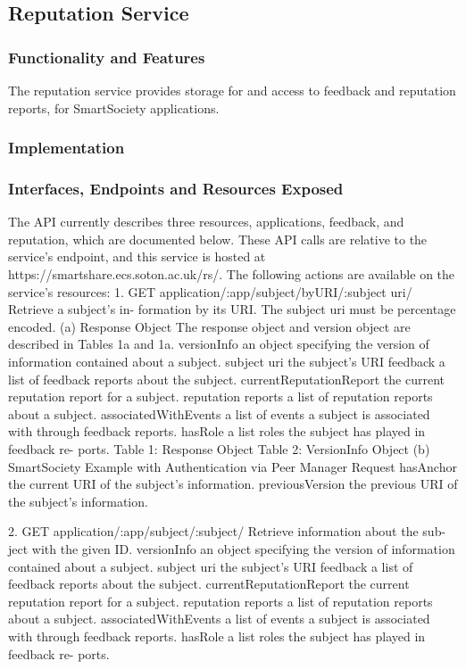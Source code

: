 \subsection{Reputation Service}
\subsubsection{Functionality and Features}
The reputation service provides storage for and access to feedback and reputation reports, for SmartSociety applications.
\subsubsection{Implementation}
\subsubsection{Interfaces, Endpoints and Resources Exposed}
The API currently describes three resources, applications, feedback, and reputation, which are documented below. These API calls are relative to the service’s endpoint, and this service is hosted at https://smartshare.ecs.soton.ac.uk/rs/.
The following actions are available on the service’s resources:
1. GET application/:app/subject/byURI/:subject uri/ Retrieve a subject’s in- formation by its URI. The subject uri must be percentage encoded.
(a) Response Object
The response object and version object are described in Tables 1a and 1a.
versionInfo
an object specifying the version of information contained about a subject.
subject uri
the subject’s URI
feedback
a list of feedback reports about the subject.
currentReputationReport
the current reputation report for a subject.
reputation reports
a list of reputation reports about a subject.
associatedWithEvents
a list of events a subject is associated with through feedback reports.
hasRole
a list roles the subject has played in feedback re- ports.
Table 1: Response Object
Table 2: VersionInfo Object
(b) SmartSociety Example with Authentication via Peer Manager Request
hasAnchor
the current URI of the subject’s information.
previousVersion
the previous URI of the subject’s information.


2. GET application/:app/subject/:subject/ Retrieve information about the sub- ject with the given ID.
versionInfo an object specifying the version of information contained about a subject.
subject uri
the subject’s URI
feedback
a list of feedback reports about the subject.
currentReputationReport
the current reputation report for a subject.
reputation reports
a list of reputation reports about a subject.
associatedWithEvents
a list of events a subject is associated with through feedback reports.
hasRole
a list roles the subject has played in feedback re- ports.




